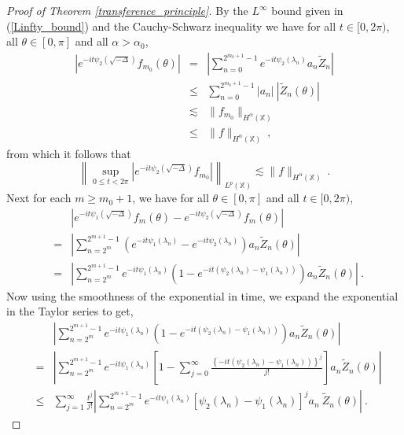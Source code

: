 \documentclass[10pt,a4paper]{amsart}
\newcommand{\X}{\mathbb X}%
\begin{document}
\begin{proof}[Proof of Theorem \ref{transference_principle}]
By the $L^\infty$ bound given in (\ref{Linfty_bound}) and the Cauchy-Schwarz inequality we have for all $t \in [0,2\pi)$, all $\theta \in [0,\pi]$ and all $\alpha>\alpha_0$,
\begin{eqnarray*}
\left|e^{-it\psi_2\left(\sqrt{-\Delta}\right)} f_{m_0}(\theta) \right| &=& \left|\sum_{n=0}^{2^{m_0+1}-1} e^{-it\psi_2\left(\lambda_n\right)} a_n \tilde{Z}_n \right| \\
&\le & \sum_{n=0}^{2^{m_0+1}-1} |a_n|\:\left|\tilde{Z}_n(\theta)\right|\\
&\lesssim & \|f_{m_0}\|_{H^{\alpha}(\X)} \\
& \le & \|f\|_{H^{\alpha}(\X)}\:,
\end{eqnarray*}
from which it follows that
\begin{equation} \label{transference_pf_eq5}
\left\|\sup_{0 \le t < 2\pi} \left|e^{-it\psi_2\left(\sqrt{-\Delta}\right)} f_{m_0} \right|\right\|_{L^p(\X)} \lesssim  \|f\|_{H^{\alpha}(\X)}\:.
\end{equation}
Next for each $m \ge m_0+1$, we have for all $\theta \in [0,\pi]$ and all $t \in [0,2\pi)$,
\begin{eqnarray*}
&&\left|e^{-it\psi_1\left(\sqrt{-\Delta}\right)} f_m(\theta)   - e^{-it\psi_2\left(\sqrt{-\Delta}\right)} f_m(\theta) \right| \\
&=& \left|\sum_{n=2^m}^{2^{m+1}-1} \left(e^{-it\psi_1\left(\lambda_n\right)} - e^{-it\psi_2\left(\lambda_n\right)}\right) a_n \tilde{Z}_n(\theta) \right|\\
&=& \left|\sum_{n=2^m}^{2^{m+1}-1} e^{-it\psi_1\left(\lambda_n\right)}\left(1 - e^{-it\left(\psi_2\left(\lambda_n\right)-\psi_1\left(\lambda_n\right)\right)}\right) a_n \tilde{Z}_n(\theta) \right|\:.
\end{eqnarray*}
Now using the smoothness of the exponential in time, we expand the exponential in the Taylor series to get,
\begin{eqnarray*}
&&\left|\sum_{n=2^m}^{2^{m+1}-1} e^{-it\psi_1\left(\lambda_n\right)}\left(1 - e^{-it\left(\psi_2\left(\lambda_n\right)-\psi_1\left(\lambda_n\right)\right)}\right) a_n \tilde{Z}_n(\theta) \right| \\
&=& \left|\sum_{n=2^m}^{2^{m+1}-1} e^{-it\psi_1\left(\lambda_n\right)}\left[1 - \sum_{j=0}^\infty \frac{\left\{-it\left(\psi_2\left(\lambda_n\right)-\psi_1\left(\lambda_n\right)\right)\right\}^j}{j!}\right]
a_n \tilde{Z}_n(\theta) \right|\\
& \le & \sum_{j=1}^\infty \frac{t^j}{j!} \left|\sum_{n=2^m}^{2^{m+1}-1}e^{-it\psi_1\left(\lambda_n\right)} \left[\psi_2(\lambda_n)-\psi_1(\lambda_n)\right]^j a_n\:\tilde{Z}_n(\theta)\right|\:.

\end{eqnarray*}
\end{proof}
\end{document}
